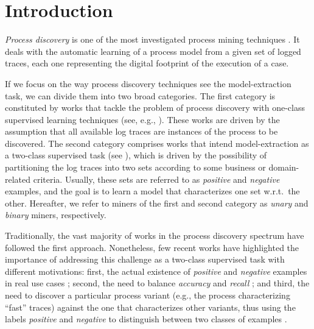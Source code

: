 

\section{Introduction}
\label{sec:introduction}

\emph{Process discovery} is one of the most investigated process mining techniques \cite{2012-Aalst}. It deals with the automatic learning of a process model from a given set of logged traces, each one representing the digital footprint of the execution of a case.

If we focus on the way process discovery techniques see the model-extraction task, we can divide them into two broad categories. %
The first category is constituted by works that tackle the problem of process discovery with one-class supervised learning techniques (see, e.g., \cite{2010-Aalst,2004-Aalst,2007-Gunther,2003-Weijters}). These works are driven by the assumption that all available log traces are instances of the process to be discovered. The second category comprises works that intend model-extraction as a two-class supervised task (see \cite{2009-Chesani,2009-Goedertier,2006-Maruster}), which is driven by the possibility of partitioning the log traces into two sets according to some business or domain-related criteria. Usually, these sets are referred to as \emph{positive} and \emph{negative} examples, and the goal is to learn a model that characterizes one set w.r.t.\ the other. Hereafter, we refer to miners of the first and second category as \emph{unary} and \emph{binary} miners, respectively. 

Traditionally, the vast majority of works in the process discovery spectrum have followed the first approach. Nonetheless, few recent works \cite{deviant-tkde,2018-Ponce,DBLP:conf/bpm/SlaatsDB21} have highlighted the importance of addressing this challenge as a two-class supervised task with different motivations: first, the actual existence of \emph{positive} and \emph{negative} examples in real use cases \cite{2018-Ponce,DBLP:conf/bpm/SlaatsDB21}; second, the need to balance \emph{accuracy} and \emph{recall} \cite{DBLP:conf/bpm/SlaatsDB21}; and third, the need to discover a particular process variant (e.g., the process characterizing ``fast'' traces) against the one that characterizes other variants, thus using the labels \emph{positive} and \emph{negative} to distinguish between two classes of examples \cite{deviant-tkde}.  

